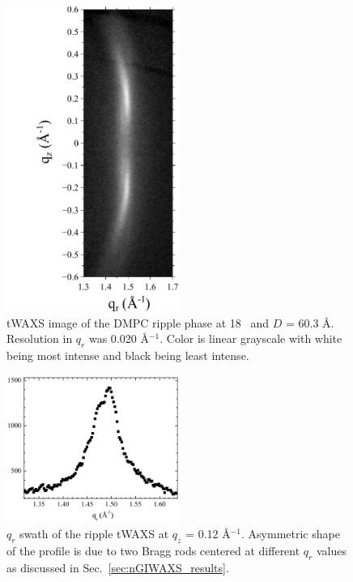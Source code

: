 \begin{figure}[htbp]
  \centering
  \includegraphics[trim=20 0 0 0,clip,width=0.5\textwidth]{figures/ripple/tWAXS/twaxs_ripple}
  \caption[tWAXS image of the DMPC ripple phase]{tWAXS image of the DMPC
  ripple phase at 18 \textcelsius\ and $D$ = 60.3 \AA. 
  Resolution in $q_r$ was 0.020 \AA$^{-1}$. Color is linear grayscale
  with white being most intense and black being least intense.}
  \label{fig:twaxs_ripple}
\end{figure}

\begin{figure}[htbp]
  \centering
  \includegraphics[width=0.5\textwidth]{figures/ripple/tWAXS/twaxs_weak_qr}
  \caption{$q_r$ swath of the ripple tWAXS at $q_z$ = 0.12 \AA$^{-1}$. 
  Asymmetric shape of the profile is due to
  two Bragg rods centered at different $q_r$ values as discussed in
  Sec.~\ref{sec:nGIWAXS_results}.}
  \label{fig:twaxs_weak_qr}
\end{figure}

